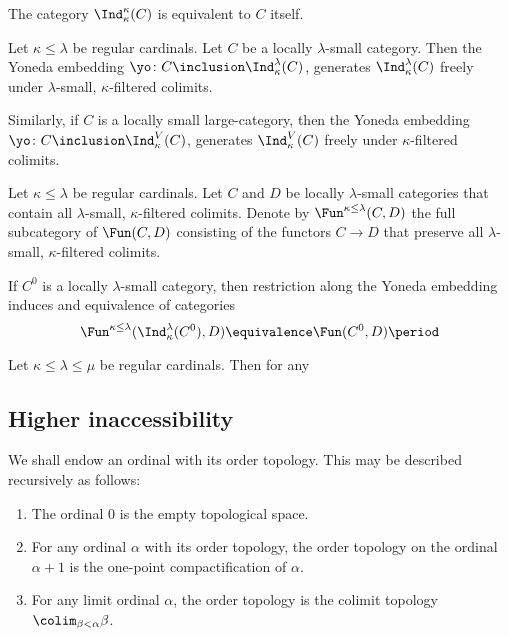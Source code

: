 \begin{eg}
	The category $ \Ind_{\kappa}^{\kappa}(C) $ is
	equivalent to $ C $ itself.
\end{eg}

\begin{proposition}
	Let $ \kappa \leq \lambda $ be regular cardinals.
	Let $ C $ be a locally $ \lambda $-small category.
	Then the Yoneda embedding
	$ \yo \colon C \inclusion \Ind_{\kappa}^{\lambda}(C) $,
	generates $ \Ind_{\kappa}^{\lambda}(C) $ freely under
	$ \lambda $-small, $ \kappa $-filtered colimits.

	Similarly, if $ C $ is a locally small large-category,
	then the Yoneda embedding
	$ \yo \colon C \inclusion \Ind_{\kappa}^{V}(C) $,
	generates $ \Ind_{\kappa}^V(C) $ freely under
	$ \kappa $-filtered colimits.
\end{proposition}

\begin{notation}
	Let $ \kappa \leq \lambda $ be regular cardinals.
	Let $ C $ and $ D $  be locally $ \lambda $-small categories
	that contain all $ \lambda $-small, $ \kappa $-filtered colimits.
	Denote by $ \Fun^{\kappa \leq \lambda}(C, D) $
	the full subcategory of $ \Fun(C,D) $ consisting of
	the functors $ C \to D $ that preserve all 
	$ \lambda $-small, $ \kappa $-filtered colimits.

	If $ C^0 $ is a locally $ \lambda $-small category,
	then restriction along the Yoneda embedding
	induces and equivalence of categories
	\[
		\Fun^{\kappa \leq \lambda}(\Ind_{\kappa}^{\lambda}(C^0), D)
		\equivalence \Fun(C^0, D) \period
	\]
\end{notation}

\begin{eg}
	Let $ \kappa \leq \lambda \leq \mu $ be regular cardinals.
	Then for any 
\end{eg}

\subsection{Higher inaccessibility}%
\label{sub:higher_inaccessibility}

\begin{nul}
	We shall endow an ordinal with its order topology.
	This may be described recursively as follows:
	\begin{enumerate}
		\item The ordinal $ 0 $ is the empty topological space.
		\item For any ordinal $ \alpha $ with its order topology,
			the order topology on the ordinal $ \alpha + 1 $
			is the one-point compactification of $ \alpha $.
		\item For any limit ordinal $ \alpha $,
			the order topology is the colimit topology
			$ \colim_{\beta < \alpha} \beta $.
	\end{enumerate}
\end{nul}

